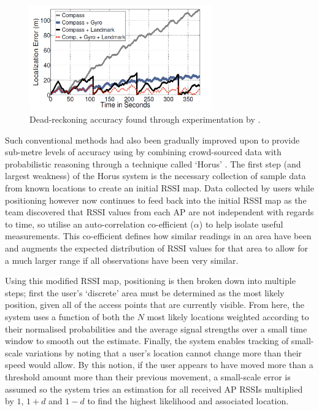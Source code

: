 \documentclass{UoYCSproject}
\begin{document}
                \begin{figure}[h]
                    \label{fig:dead}
                    \caption{Dead-reckoning accuracy found through experimentation by \citet{wang2012no}.}
                    \centering
                        \includegraphics[width=0.7\textwidth]{dead.png}
                \end{figure}
                
                Such conventional methods had also been gradually improved upon to provide sub-metre levels of accuracy using by combining crowd-sourced data with probabilistic reasoning through a technique called `Horus' \citep{youssef2005horus}. The first step (and largest weakness) of the Horus system is the necessary collection of sample data from known locations to create an initial RSSI map. Data collected by users while positioning however now continues to feed back into the initial RSSI map as the team discovered that RSSI values from each AP are not independent with regards to time, so utilise an auto-correlation co-efficient ($\alpha$) to help isolate useful measurements. This co-efficient defines how similar readings in an area have been and augments the expected distribution of RSSI values for that area to allow for a much larger range if all observations have been very similar.
                
                Using this modified RSSI map, positioning is then broken down into multiple steps; first the user's `discrete' area must be determined as the most likely position, given all of the access points that are currently visible. From here, the system uses a function of both the $N$ most likely locations weighted according to their normalised probabilities and the average signal strengths over a small time window to smooth out the estimate. Finally, the system enables tracking of small-scale variations by noting that a user's location cannot change more than their speed would allow. By this notion, if the user appears to have moved more than a threshold amount more than their previous movement, a small-scale error is assumed so the system tries an estimation for all received AP RSSIs multiplied by $1$, $1+d$ and $1-d$ to find the highest likelihood and associated location.
                
\end{document}
